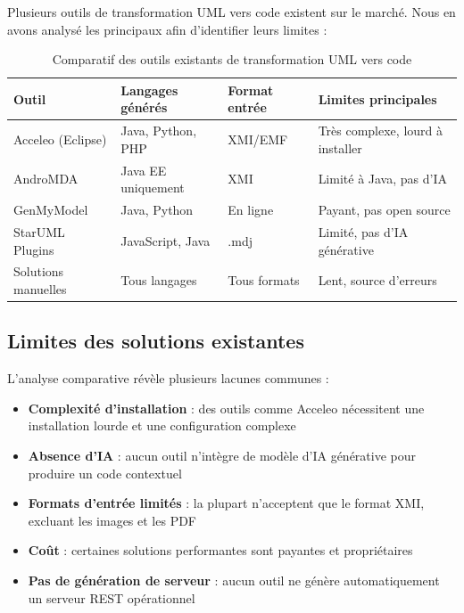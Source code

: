 Plusieurs outils de transformation UML vers code existent sur le marché. Nous en avons analysé les principaux afin d'identifier leurs limites :

\begin{table}[htbp]
\centering
\renewcommand{\arraystretch}{1.4}
\begin{tabular}{|l|l|l|p{4.5cm}|}
\hline
\rowcolor{gray!30}
\textbf{Outil} & \textbf{Langages générés} & \textbf{Format entrée} & \textbf{Limites principales} \\
\hline
Acceleo (Eclipse) & Java, Python, PHP & XMI/EMF & Très complexe, lourd à installer \\
\hline
AndroMDA & Java EE uniquement & XMI & Limité à Java, pas d'IA \\
\hline
GenMyModel & Java, Python & En ligne & Payant, pas open source \\
\hline
StarUML Plugins & JavaScript, Java & .mdj & Limité, pas d'IA générative \\
\hline
Solutions manuelles & Tous langages & Tous formats & Lent, source d'erreurs \\
\hline
\end{tabular}
\caption{Comparatif des outils existants de transformation UML vers code}
\end{table}

\subsection{Limites des solutions existantes}

L'analyse comparative révèle plusieurs lacunes communes :

\begin{itemize}
    \item \textbf{Complexité d'installation} : des outils comme Acceleo nécessitent une installation lourde et une configuration complexe
    \item \textbf{Absence d'IA} : aucun outil n'intègre de modèle d'IA générative pour produire un code contextuel
    \item \textbf{Formats d'entrée limités} : la plupart n'acceptent que le format XMI, excluant les images et les PDF
    \item \textbf{Coût} : certaines solutions performantes sont payantes et propriétaires
    \item \textbf{Pas de génération de serveur} : aucun outil ne génère automatiquement un serveur REST opérationnel
\end{itemize}

